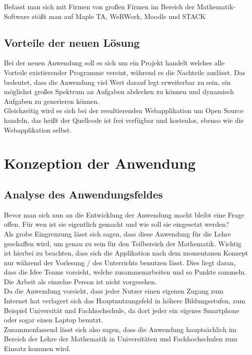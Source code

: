 Befasst man sich mit Firmen von großen Firmen im Bereich der Mathematik-Software stößt man auf Maple TA, WeBWork, Moodle und STACK


\section{Vorteile der neuen Lösung}

Bei der neuen Anwendung soll es sich um ein Projekt handelt welches alle Vorteile existierender Programme vereint, während es die Nachteile auslässt. Das bedeutet, dass die Anwendung viel Wert darauf legt erweiterbar zu sein, ein möglichst großes Spektrum an Aufgaben abdecken zu können und dynamisch Aufgaben zu generieren können. \\
Gleichzeitig wird es sich bei der resultierenden Webapplikation um Open Source handeln, das heißt der Quellcode ist frei verfügbar und kostenlos, ebenso wie die Webapplikation selbst.

\chapter{Konzeption der Anwendung}

\section{Analyse des Anwendungsfeldes}

Bevor man sich nun an die Entwicklung der Anwendung macht bleibt eine Frage offen. Für wen ist sie eigentlich gemacht und wie soll sie eingesetzt werden? \\
Als grobe Eingrenzung lässt sich sagen, dass diese Anwendung für die Lehre geschaffen wird, um genau zu sein für den Teilbereich der Mathematik. Wichtig ist hierbei zu beachten, dass sich die Applikation nach dem momentanen Konzept nur während der Vorlesung / des Unterrichts benutzen lässt. Dies liegt daran, dass die Idee Teams vorsieht, welche zusammenarbeiten und so Punkte sammeln. Die Arbeit als einzelne Person ist nicht vorgesehen. \\
Da die Anwendung vorsieht, dass jeder Nutzer einen eigenen Zugang zum Internet hat verlagert sich das Hauptnutzungsfeld in höhere Bildungsstufen, zum Beispiel Universität und Fachhochschule, da dort jeder ein eigenes Smartphone oder sogar einen Laptop benutzt. \\
Zusammenfassend lässt sich also sagen, dass die Anwendung hauptsächlich im Bereich der Lehre der Mathematik in Universitäten und Fachhochschulen zum Einsatz kommen wird.


